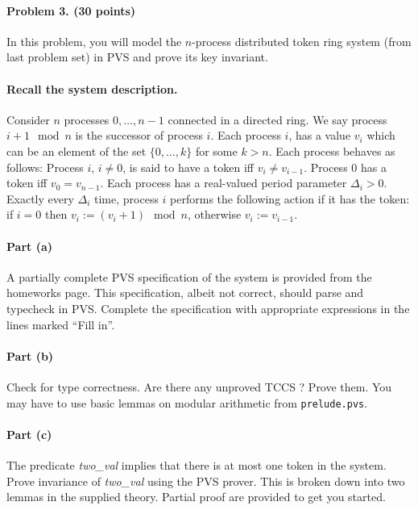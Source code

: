 \documentclass[11pt]{article}
\begin{document}
 \paragraph{Problem 3. (30 points)} In this problem, you will model the $n$-process distributed token ring system (from last problem set) in PVS  and prove its key invariant. 

\paragraph{Recall the system description.} Consider $n$ processes $0, \ldots, n-1$ connected in a directed ring. 
We say process $i+1 \mod n$ is the successor of process $i$. Each process $i$, has a value $v_i$ which can be an element of the set $\{0, \ldots, k\}$ for some $k > n$. Each process behaves as follows: Process $i$, $i \neq 0$, is said to have a token iff $v_i \neq v_{i- 1}$. Process $0$ has a token iff $v_0 = v_{n-1}$. Each process has a real-valued period parameter  $\Delta_i > 0$. 
Exactly every $\Delta_i$ time, process $i$ performs the following action if it has the token: 
if $i = 0$ then $v_i := (v_i + 1) \mod n$, otherwise $v_i := v_{i- 1}$. 

\paragraph{Part (a)} 
A partially complete PVS specification of the system is provided from the homeworks page. This specification, albeit not correct, should parse and typecheck in PVS. Complete the specification with appropriate expressions in the lines marked ``Fill in''.

\paragraph{Part (b)} Check for type correctness. Are there any unproved TCCS ? Prove them. You may have to use basic lemmas on modular arithmetic from \texttt{prelude.pvs}.

\paragraph{Part (c)} The predicate {\em two\_val\/} implies that there is at most one token in the system. Prove invariance of {\em two\_val\/} using the PVS prover. This is broken down into two lemmas in the supplied theory. Partial proof are provided to get you started.





%
%
\end{document}

